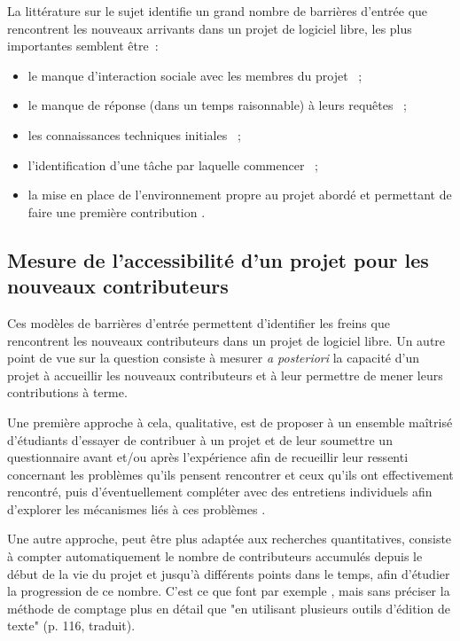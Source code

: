 \documentclass[dvipsnames]{llncs}
\begin{document}
    La littérature sur le sujet identifie un grand nombre de barrières d'entrée que rencontrent les nouveaux
    arrivants dans un projet de logiciel libre, les plus importantes semblent être :

    \begin{itemize}
        \item le manque d'interaction sociale avec les membres du projet
            \parencite[-1cm]{barriers-meta-2015,social-barriers-2015} ;
        \item le manque de réponse (dans un temps raisonnable) à leurs requêtes
            \parencite{barriers-meta-2015} ;
        \item les connaissances techniques initiales \parencite{barriers-meta-2015} ;
        \item l'identification d'une tâche par laquelle commencer \parencite{first-task-2015} ;
        \item la mise en place de l'environnement propre au projet abordé et permettant de faire une première
            contribution \parencite{newcomers-accessibility-2016}.
    \end{itemize}

    \subsection{Mesure de l'accessibilité d'un projet pour les nouveaux contributeurs}

    \label{sec:accessibility-measure}
    Ces modèles de barrières d'entrée permettent d'identifier les freins que rencontrent les nouveaux
    contributeurs dans un projet de logiciel libre. Un autre point de vue sur la question consiste à mesurer
    \emph{a posteriori} la capacité d'un projet à accueillir les nouveaux contributeurs et à leur permettre de
    mener leurs contributions à terme.

    Une première approche à cela, qualitative, est de proposer à un ensemble maîtrisé d'étudiants d'essayer de
    contribuer à un projet et de leur soumettre un questionnaire avant et/ou après l'expérience afin de
    recueillir leur ressenti concernant les problèmes qu'ils pensent rencontrer et ceux qu'ils ont
    effectivement rencontré, puis d'éventuellement compléter avec des entretiens individuels afin d'explorer
    les mécanismes liés à ces problèmes
    \parencites{newcomers-accessibility-2016}{newcomers-onboarding-2018}[voir
    aussi][]{newcomers-adaptation-2005}.

    Une autre approche, peut être plus adaptée aux recherches quantitatives, consiste à compter
    automatiquement le nombre de contributeurs accumulés depuis le début de la vie du projet et jusqu'à
    différents points dans le temps, afin d'étudier la progression de ce nombre. C'est ce que font par exemple
    \textcite{contributor-count-2006}, mais sans préciser la méthode de comptage plus en détail que "en
    utilisant plusieurs outils d'édition de texte" (p. 116, traduit).
\end{document}
